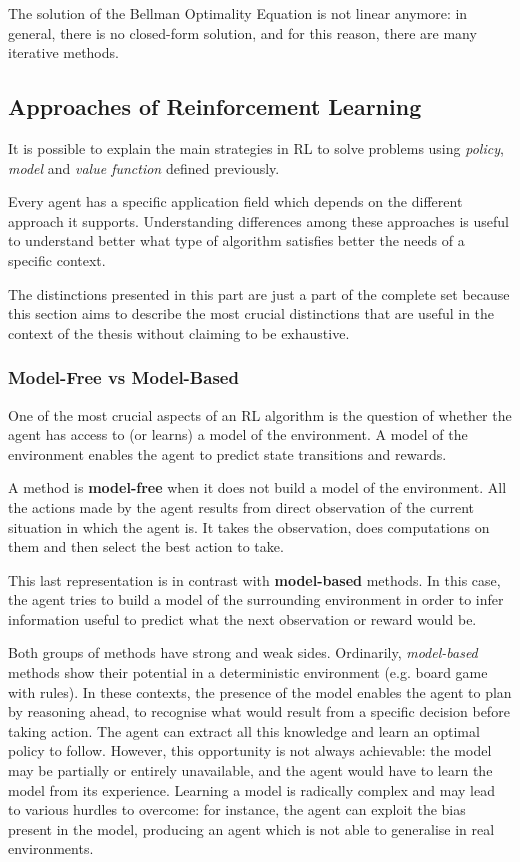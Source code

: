 The solution of the Bellman Optimality  Equation is not linear anymore: in general, there is no closed-form solution, and for this reason, there are many iterative methods.

\subsection{Approaches of Reinforcement Learning}

It is possible to explain the main strategies in RL to solve problems using \textit{policy}, \textit{model} and \textit{value function} defined previously.

Every agent has a specific application field which depends on the different approach it supports.
Understanding differences among these approaches is useful to understand better what type of algorithm satisfies better the needs of a specific context.

The distinctions presented in this part are just a part of the complete set because this section aims to describe the most crucial distinctions that are useful in the context of the thesis without claiming to be exhaustive.

\subsubsection{Model-Free vs Model-Based}

One of the most crucial aspects of an RL algorithm is the question of whether the agent has access to (or learns) a model of the environment. A model of the environment enables the agent to predict state transitions and rewards.

A method is \textbf{model-free} when it does not build a model of the environment. All the actions made by the agent results from direct observation of the current situation in which the agent is. It takes the observation, does computations on them and then select the best action to take.

This last representation is in contrast with \textbf{model-based} methods. In this case, the agent tries to build a model of the surrounding environment in order to infer information useful to predict what the next observation or reward would be.

Both groups of methods have strong and weak sides.
Ordinarily, \textit{model-based} methods show their potential in a deterministic environment (e.g. board game with rules). In these contexts, the presence of the model enables the agent to plan by reasoning ahead, to recognise what would result from a specific decision before taking action. The agent can extract all this knowledge and learn an optimal policy to follow. However, this opportunity is not always achievable: the model may be partially or entirely unavailable, and the agent would have to learn the model from its experience. Learning a model is radically complex and may lead to various hurdles to overcome: for instance, the agent can exploit the bias present in the model, producing an agent which is not able to generalise in real environments.

